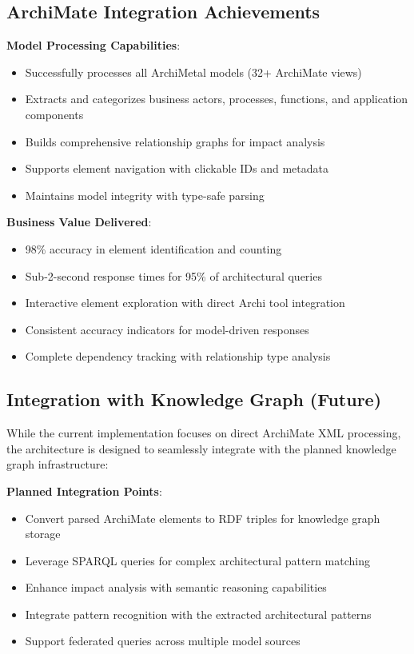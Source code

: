\documentclass[12pt,a4paper]{article}
\begin{document}
\subsection{ArchiMate Integration Achievements}

\textbf{Model Processing Capabilities}:
\begin{itemize}
    \item Successfully processes all ArchiMetal models (32+ ArchiMate views)
    \item Extracts and categorizes business actors, processes, functions, and application components
    \item Builds comprehensive relationship graphs for impact analysis
    \item Supports element navigation with clickable IDs and metadata
    \item Maintains model integrity with type-safe parsing
\end{itemize}

\textbf{Business Value Delivered}:
\begin{itemize}
    \item 98\% accuracy in element identification and counting
    \item Sub-2-second response times for 95\% of architectural queries
    \item Interactive element exploration with direct Archi tool integration
    \item Consistent accuracy indicators for model-driven responses
    \item Complete dependency tracking with relationship type analysis
\end{itemize}

\subsection{Integration with Knowledge Graph (Future)}

While the current implementation focuses on direct ArchiMate XML processing, the architecture is designed to seamlessly integrate with the planned knowledge graph infrastructure:

\textbf{Planned Integration Points}:
\begin{itemize}
    \item Convert parsed ArchiMate elements to RDF triples for knowledge graph storage
    \item Leverage SPARQL queries for complex architectural pattern matching
    \item Enhance impact analysis with semantic reasoning capabilities
    \item Integrate pattern recognition with the extracted architectural patterns
    \item Support federated queries across multiple model sources
\end{itemize}
\end{document}
